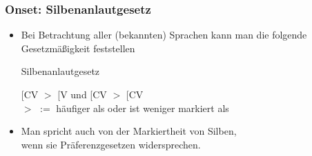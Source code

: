 
\begin{frame}
\frametitle{Onset: Silbenanlautgesetz}

\begin{itemize}
	\item Bei Betrachtung aller (bekannten) Sprachen kann man die folgende Gesetzmäßigkeit feststellen \citep[cf.][212f.]{Hall00a}
	
	\begin{block}{Silbenanlautgesetz}
	
	\sub{$\sigma$}[CV $>$ \sub{$\sigma$}[V 
	und
	\sub{$\sigma$}[CV $>$ \sub{$\sigma$}[CV \\
	$>$ $:=$ häufiger als oder ist weniger markiert als 



	
	\end{block}
	 
	 \item Man spricht auch von der Markiertheit von Silben,\\
               wenn sie Präferenzgesetzen widersprechen.

\end{itemize}

\end{frame}




